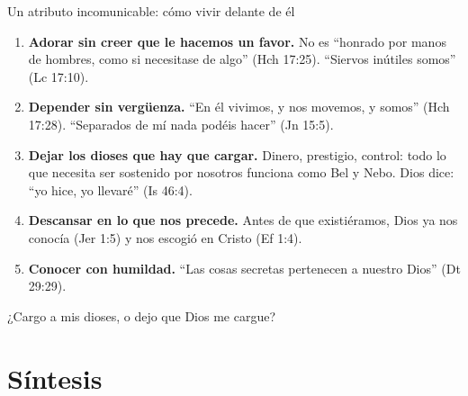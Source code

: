\begin{frame}{Un atributo incomunicable: cómo vivir delante de él}
\scriptsize
\begin{enumerate}
\item \textbf{Adorar sin creer que le hacemos un favor.} No es ``honrado por manos de hombres, como si necesitase de algo'' (Hch 17:25). ``Siervos inútiles somos'' (Lc 17:10).
\item \textbf{Depender sin vergüenza.} ``En él vivimos, y nos movemos, y somos'' (Hch 17:28). ``Separados de mí nada podéis hacer'' (Jn 15:5).
\item \textbf{Dejar los dioses que hay que cargar.} Dinero, prestigio, control: todo lo que necesita ser sostenido por nosotros funciona como Bel y Nebo. Dios dice: ``yo hice, yo llevaré'' (Is 46:4).
\item \textbf{Descansar en lo que nos precede.} Antes de que existiéramos, Dios ya nos conocía (Jer 1:5) y nos escogió en Cristo (Ef 1:4).
\item \textbf{Conocer con humildad.} ``Las cosas secretas pertenecen a \SENOR{} nuestro Dios'' (Dt 29:29).
\end{enumerate}\medskip
\begin{tcolorbox}[colback=papiro,colframe=dorado,boxrule=1.2pt,arc=3pt]
\centering\small ¿Cargo a mis dioses, o dejo que Dios me cargue?
\end{tcolorbox}
\end{frame}

\section{Síntesis}

